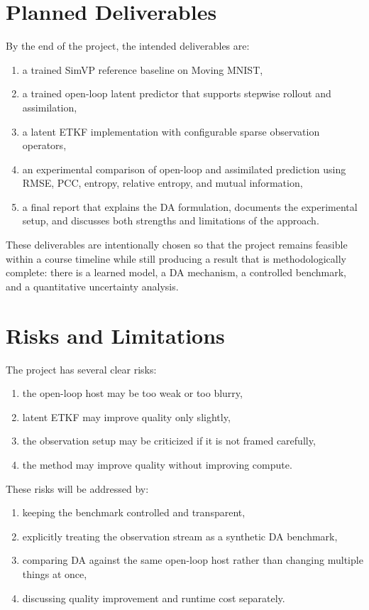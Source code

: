 \documentclass{article}
\begin{document}
\section{Planned Deliverables}

By the end of the project, the intended deliverables are:
\begin{enumerate}[leftmargin=1.2em]
    \item a trained SimVP reference baseline on Moving MNIST,
    \item a trained open-loop latent predictor that supports stepwise rollout and assimilation,
    \item a latent ETKF implementation with configurable sparse observation operators,
    \item an experimental comparison of open-loop and assimilated prediction using RMSE, PCC, entropy, relative entropy, and mutual information,
    \item a final report that explains the DA formulation, documents the experimental setup, and discusses both strengths and limitations of the approach.
\end{enumerate}

These deliverables are intentionally chosen so that the project remains feasible within a course timeline while still producing a result that is methodologically complete: there is a learned model, a DA mechanism, a controlled benchmark, and a quantitative uncertainty analysis.

\section{Risks and Limitations}

The project has several clear risks:
\begin{enumerate}[leftmargin=1.2em]
    \item the open-loop host may be too weak or too blurry,
    \item latent ETKF may improve quality only slightly,
    \item the observation setup may be criticized if it is not framed carefully,
    \item the method may improve quality without improving compute.
\end{enumerate}

These risks will be addressed by:
\begin{enumerate}[leftmargin=1.2em]
    \item keeping the benchmark controlled and transparent,
    \item explicitly treating the observation stream as a synthetic DA benchmark,
    \item comparing DA against the same open-loop host rather than changing multiple things at once,
    \item discussing quality improvement and runtime cost separately.
\end{enumerate}
\end{document}
